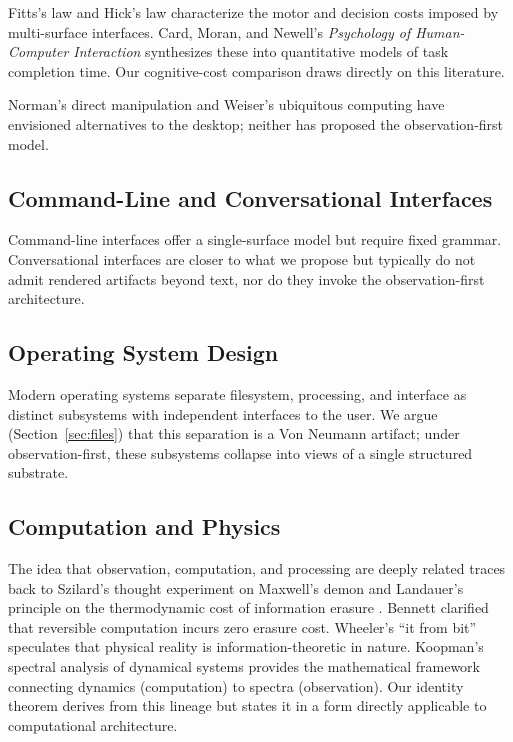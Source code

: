 \documentclass[11pt,twocolumn,a4paper]{article}
\theoremstyle{definition}
\theoremstyle{remark}
\begin{document}
Fitts's law \citep{fitts1954information} and Hick's law \citep{hick1952rate} characterize the motor and decision costs imposed by multi-surface interfaces. Card, Moran, and Newell's \emph{Psychology of Human-Computer Interaction} \citep{card1983psychology} synthesizes these into quantitative models of task completion time. Our cognitive-cost comparison draws directly on this literature.

Norman's direct manipulation \citep{norman1986cognitive, hutchins1985direct} and Weiser's ubiquitous computing \citep{weiser1991computer} have envisioned alternatives to the desktop; neither has proposed the observation-first model.

\subsection{Command-Line and Conversational Interfaces}

Command-line interfaces \citep{ritchie1978unix} offer a single-surface model but require fixed grammar. Conversational interfaces \citep{mctear2020conversational} are closer to what we propose but typically do not admit rendered artifacts beyond text, nor do they invoke the observation-first architecture.

\subsection{Operating System Design}

Modern operating systems \citep{tanenbaum2014modern, silberschatz2018operating} separate filesystem, processing, and interface as distinct subsystems with independent interfaces to the user. We argue (Section~\ref{sec:files}) that this separation is a Von Neumann artifact; under observation-first, these subsystems collapse into views of a single structured substrate.

\subsection{Computation and Physics}

The idea that observation, computation, and processing are deeply related traces back to Szilard's thought experiment on Maxwell's demon \citep{szilard1929entropieverminderung} and Landauer's principle on the thermodynamic cost of information erasure \citep{landauer1961irreversibility}. Bennett \citep{bennett1982thermodynamics} clarified that reversible computation incurs zero erasure cost. Wheeler's ``it from bit'' \citep{wheeler1990information} speculates that physical reality is information-theoretic in nature. Koopman's spectral analysis of dynamical systems \citep{koopman1931hamiltonian, mezic2005spectral} provides the mathematical framework connecting dynamics (computation) to spectra (observation). Our identity theorem derives from this lineage but states it in a form directly applicable to computational architecture.
\end{document}
